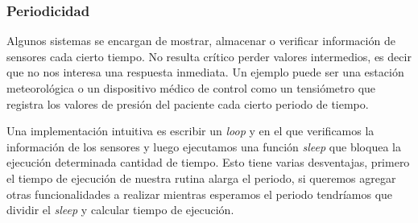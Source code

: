 \begin{figure}[H]
\begin{center}
{
}
\end{center}
\end{figure}


\subsubsection*{Periodicidad}

Algunos sistemas se encargan de mostrar, almacenar o verificar información de sensores cada cierto tiempo. No resulta crítico perder valores intermedios, es decir que no nos interesa una respuesta inmediata. Un ejemplo puede ser una estación meteorológica o un dispositivo médico de control como un tensiómetro que registra los valores de presión del paciente cada cierto periodo de tiempo.

Una implementación intuitiva es escribir un \textit{loop} y en el que verificamos la información de los sensores y luego ejecutamos una función \textit{sleep} que bloquea la ejecución determinada cantidad de tiempo. Esto tiene varias desventajas, primero el tiempo de ejecución de nuestra rutina alarga el periodo, si queremos agregar otras funcionalidades a realizar mientras esperamos el periodo tendríamos que dividir el \textit{sleep} y calcular tiempo de ejecución.

